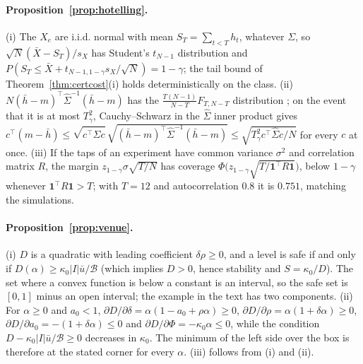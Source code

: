 \paragraph{Proposition~\ref{prop:hotelling}.} (i) The $X_e$ are i.i.d. normal with mean $S_T=\sum_{t<T}h_t$, whatever $\Sigma$, so $\sqrt N(\bar X-S_T)/s_X$ has Student's $t_{N-1}$ distribution and $P(S_T\le\bar X+t_{N-1,1-\gamma}s_X/\sqrt N)=1-\gamma$; the tail bound of Theorem~\ref{thm:certcost}(i) holds deterministically on the class. (ii) $N(\bar h-m)^\top\hat\Sigma^{-1}(\bar h-m)$ has the $\frac{T(N-1)}{N-T}F_{T,N-T}$ distribution \citep{hotelling1931}; on the event that it is at most $T^2_\gamma$, Cauchy--Schwarz in the $\hat\Sigma$ inner product gives $c^\top(m-\bar h)\le\sqrt{c^\top\hat\Sigma c}\,\sqrt{(\bar h-m)^\top\hat\Sigma^{-1}(\bar h-m)}\le\sqrt{T^2_\gamma c^\top\hat\Sigma c/N}$ for every $c$ at once. (iii) If the taps of an experiment have common variance $\sigma^2$ and correlation matrix $R$, the margin $z_{1-\gamma}\sigma\sqrt{T/N}$ has coverage $\Phi\bigl(z_{1-\gamma}\sqrt{T/\mathbf 1^\top R\mathbf 1}\bigr)$, below $1-\gamma$ whenever $\mathbf 1^\top R\mathbf 1>T$; with $T=12$ and autocorrelation $0.8$ it is $0.751$, matching the simulations.

\paragraph{Proposition~\ref{prop:venue}.} (i) $D$ is a quadratic with leading coefficient $\delta\rho\ge0$, and a level is safe if and only if $D(\alpha)\ge\kappa_0|I|\bar u/\mathcal B$ (which implies $D>0$, hence stability and $S=\kappa_0/D$). The set where a convex function is below a constant is an interval, so the safe set is $[0,1]$ minus an open interval; the example in the text has two components. (ii) For $\alpha\ge0$ and $a_0<1$, $\partial D/\partial\delta=\alpha(1-a_0+\rho\alpha)\ge0$, $\partial D/\partial\rho=\alpha(1+\delta\alpha)\ge0$, $\partial D/\partial a_0=-(1+\delta\alpha)\le0$ and $\partial D/\partial\Phi=-\kappa_0\alpha\le0$, while the condition $D-\kappa_0|I|\bar u/\mathcal B\ge0$ decreases in $\kappa_0$. The minimum of the left side over the box is therefore at the stated corner for every $\alpha$. (iii) follows from (i) and (ii).

